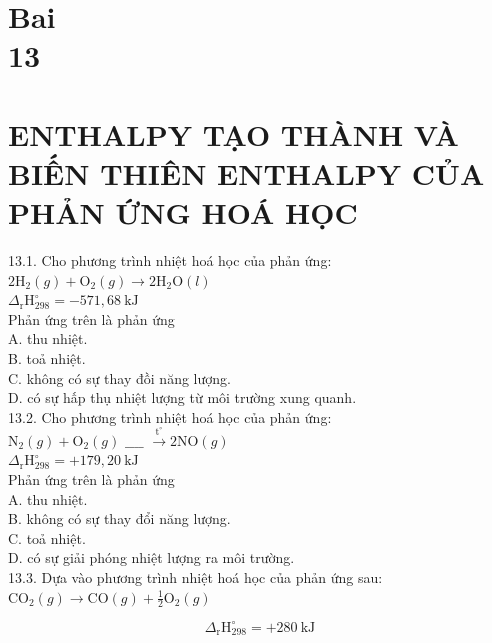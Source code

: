 \documentclass[10pt]{article}
\begin{document}
\section*{Bai \\
 13}
\section*{ENTHALPY TẠO THÀNH VÀ BIẾN THIÊN ENTHALPY CỦA PHẢN ỨNG HOÁ HỌC}
13.1. Cho phương trình nhiệt hoá học của phản ứng:\\
$2 \mathrm{H}_{2}(g)+\mathrm{O}_{2}(g) \rightarrow 2 \mathrm{H}_{2} \mathrm{O}(l)$\\
$\Delta_{\mathrm{r}} \mathrm{H}_{298}^{\circ}=-571,68 \mathrm{~kJ}$\\
Phản ứng trên là phản ứng\\
A. thu nhiệt.\\
B. toả nhiệt.\\
C. không có sự thay đồi năng lượng.\\
D. có sự hấp thụ nhiệt lượng từ môi trường xung quanh.\\
13.2. Cho phương trình nhiệt hoá học của phản ứng:\\
$\mathrm{N}_{2}(g)+\mathrm{O}_{2}(g)$ $\_\_\_\_$ $\xrightarrow{\mathrm{t}^{\circ}} 2 \mathrm{NO}(g)$\\
$\Delta_{\mathrm{r}} \mathrm{H}_{298}^{\circ}=+179,20 \mathrm{~kJ}$\\
Phản ứng trên là phản ứng\\
A. thu nhiệt.\\
B. không có sự thay đổi năng lượng.\\
C. toả nhiệt.\\
D. có sự giải phóng nhiệt lượng ra môi trường.\\
13.3. Dựa vào phương trình nhiệt hoá học của phản ứng sau:\\
$\mathrm{CO}_{2}(g) \rightarrow \mathrm{CO}(g)+\frac{1}{2} \mathrm{O}_{2}(g)$

$$
\Delta_{\mathrm{r}} \mathrm{H}_{298}^{\circ}=+280 \mathrm{~kJ}
$$
\end{document}
